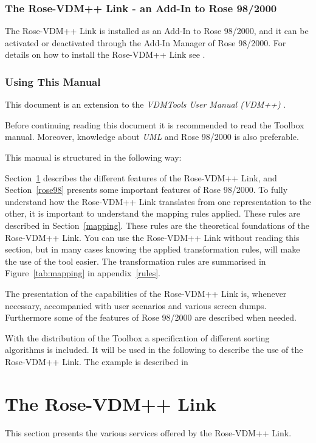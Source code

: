 \documentclass[\pformat,12pt]{article}
\newcommand{\vdmpp}{VDM++}
\newcommand{\link}{Rose-\vdmpp{} Link}
\newcommand{\rose}{Rose 98/2000}
\begin{document}
\subsubsection*{The \link{} - an Add-In to \rose{}}
The \link{} is installed as an Add-In to \rose{}, and it can be
activated or deactivated through the Add-In Manager of \rose{}. For
details on how to install the \link{} see \cite{InstallPPMan-CSK}.

\subsubsection*{Using This Manual}

This document is an extension to the {\it VDMTools User Manual (\vdmpp{})} \cite{UserManPP-CSK}.

Before continuing reading this
document it is recommended to read the Toolbox manual.
Moreover, knowledge about {\it UML} \cite{Booch&97} and \rose{} 
\cite{Rational98} is also preferable.

This manual is structured in the following way:

Section~\ref{roselink} describes the different features of the
\link{}, and Section~\ref{rose98} presents some important features
of \rose{}. To fully understand how the \link{} translates from one
representation to the other, it is important to understand the mapping
rules applied. These rules are described in
Section~\ref{mapping}. These rules are the theoretical
foundations of the \link{}. You can use the \link{} without reading
this section, but in many cases knowing the applied transformation
rules, will make the use of the tool easier. The transformation rules
are summarised in Figure~\ref{tab:mapping} in appendix~\ref{rules}.

The presentation of the capabilities of the \link{} is, whenever
necessary, accompanied with user scenarios and various screen
dumps. Furthermore some of the features of \rose{} are described
when needed.
  
With the distribution of the Toolbox a specification of different
sorting algorithms is included. It will be used in the following to
describe the use of the \link{}.  The example is described in
\cite{SortExpp-CSK}

\newpage
\section{The Rose-VDM++ Link}
\label{roselink}

This section presents the various services offered by the \link{}.  
\end{document}
